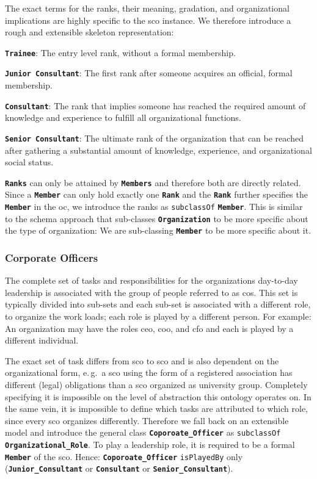 \documentclass[a4paper, DIV=13, BCOR=0cm]{scrbook}
\newcommand{\eg}{e.\,g.\ }
\newcommand{\class}[1]{\texttt{\textbf{#1}}}
\newcommand{\relation}[1]{\texttt{#1}}
\begin{document}
The exact terms for the ranks, their meaning, gradation, and organizational implications are highly specific to the \gls{sco} instance. We therefore introduce a rough and extensible skeleton representation:
\begin{compactenum}
	\item \class{Trainee}: The entry level rank, without a formal membership.
	\item \class{Junior Consultant}: The first rank after someone acquires an official, formal membership.
	\item \class{Consultant}: The rank that implies someone has reached the required amount of knowledge and experience to fulfill all organizational functions.
	\item \class{Senior Consultant}: The ultimate rank of the organization that can be reached after gathering a substantial amount of knowledge, experience, and organizational social status.
\end{compactenum}

\class{Ranks} can only be attained by \class{Members} and therefore both are directly related. Since a \class{Member} can only hold exactly one \class{Rank} and the \class{Rank} further specifies the \class{Member} in the \gls{oc}, we introduce the ranks as \relation{subclassOf} \class{Member}. This is similar to the \gls{schema} approach that sub-classes \class{Organization} to be more specific about the type of organization: We are sub-classing \class{Member} to be more specific about it.

\subsubsection{Corporate Officers}
The complete set of tasks and responsibilities for the organizations day-to-day leadership is associated with the group of people referred to as \glspl{co}. This set is typically divided into sub-sets and each sub-set is associated with a different role, to organize the work loads; each role is played by a different person. For example: An organization may have the roles \gls{ceo}, \gls{coo}, and \gls{cfo} and each is played by a different individual.

The exact set of task differs from \gls{sco} to \gls{sco} and is also dependent on the organizational form, \eg a \gls{sco} using the form of a registered association has different (legal) obligations than a \gls{sco} organized as university group. Completely specifying it is impossible on the level of abstraction this ontology operates on. In the same vein, it is impossible to define which tasks are attributed to which role, since every \gls{sco} organizes differently. Therefore we fall back on an extensible model and introduce the general class \class{Coporoate\_Officer} as \relation{subclassOf} \class{Organizational\_Role}. To play a leadership role, it is required to be a formal \class{Member} of the \gls{sco}. Hence: \class{Coporoate\_Officer} \relation{isPlayedBy} only
(\class{Junior\_Consultant} or \class{Consultant} or \class{Senior\_Consultant}).
\end{document}
